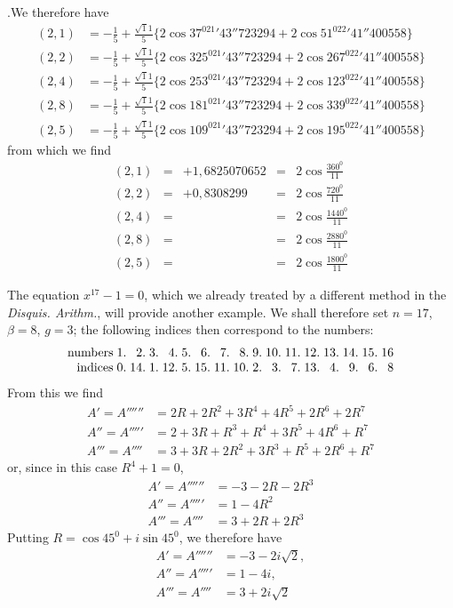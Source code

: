 .We therefore have
\[
\begin{aligned}
(2,1)&=-\frac15+\frac{\surd11}5\{2\cos37^021'43''723294+2\cos51^022'41''400558\}\\
(2,2)&=-\frac15+\frac{\surd11}5\{2\cos325^021'43''723294+2\cos267^022'41''400558\}\\
(2,4)&=-\frac15+\frac{\surd11}5\{2\cos253^021'43''723294+2\cos123^022'41''400558\}\\
(2,8)&=-\frac15+\frac{\surd11}5\{2\cos181^021'43''723294+2\cos339^022'41''400558\}\\
(2,5)&=-\frac15+\frac{\surd11}5\{2\cos109^021'43''723294+2\cos195^022'41''400558\}
\end{aligned}
\]
from which we find
\[
\begin{array}{rclcl}
(2,1)&=&+1{,}6825070652&=&2\cos\frac{360^0}{11}\\[3pt]
(2,2)&=&+0{,}8308299&=&2\cos\frac{720^0}{11}\\[3pt]
(2,4)&=&&=&2\cos\frac{1440^0}{11}\\[3pt]
(2,8)&=&&=&2\cos\frac{2880^0}{11}\\[3pt]
(2,5)&=&&=&2\cos\frac{1800^0}{11}
\end{array}
\]

The equation $x^{17}-1=0$, which we already treated by a different method in the \emph{Disquis. Arithm.}, will provide another example. We shall therefore set $n=17$, $\beta=8$, $g=3$; the following indices then correspond to the numbers:
\[
\begin{array}{r*{16}{@{\;}r}}
\text{numbers}&1\pdot&2\pdot&3\pdot&4\pdot&5\pdot&6\pdot&7\pdot&8\pdot&9\pdot&10\pdot&11\pdot&12\pdot&13\pdot&14\pdot&15\pdot&16\\
\text{indices}&0\pdot&14\pdot&1\pdot&12\pdot&5\pdot&15\pdot&11\pdot&10\pdot&2\pdot&3\pdot&7\pdot&13\pdot&4\pdot&9\pdot&6\pdot&8
\end{array}
\]
From this we find
\[
\begin{aligned}
A'=A''''''&=2R+2R^2+3R^4+4R^5+2R^6+2R^7\\
A''=A'''''&=2+3R+R^3+R^4+3R^5+4R^6+R^7\\
A'''=A''''&=3+3R+2R^2+3R^3+R^5+2R^6+R^7
\end{aligned}
\]
or, since in this case $R^4+1=0$,
\[
\begin{aligned}
A'=A''''''&=-3-2R-2R^3\\
A''=A'''''&=1-4R^2\\
A'''=A''''&=3+2R+2R^3
\end{aligned}
\]
Putting $R=\cos45^0+i\sin45^0$, we therefore have
\[
\begin{aligned}
A'=A''''''&=-3-2i\surd2,\\
A''=A'''''&=1-4i,\\
A'''=A''''&=3+2i\surd2
\end{aligned}
\]

